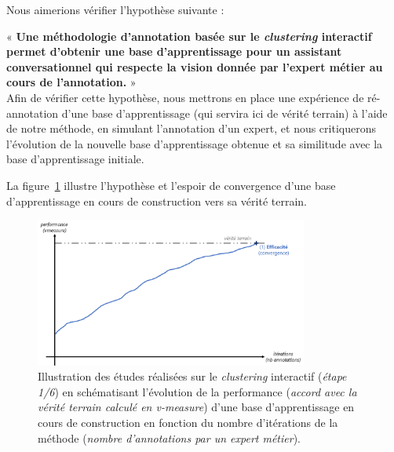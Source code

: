 		Nous aimerions vérifier l'hypothèse suivante :

		\begin{tcolorbox}[
			title=\textbf{Hypothèse d'efficacité},
			colback=gray!20,
			colframe=gray!50!black!75,
			width=\linewidth
		]
			« \textbf{
				Une méthodologie d'annotation basée sur le \textit{clustering} interactif permet d'obtenir une base d'apprentissage pour un assistant conversationnel qui respecte la vision donnée par l'expert métier au cours de l'annotation.
			} » \\
			
			Afin de vérifier cette hypothèse, nous mettrons en place une expérience de ré-annotation d'une base d'apprentissage (qui servira ici de vérité terrain) à l'aide de notre méthode, en simulant l'annotation d'un expert, et nous critiquerons l'évolution de la nouvelle base d'apprentissage obtenue et sa similitude avec la base d'apprentissage initiale.
			
			La figure~\ref{figure:4.1-HYPOTHESE-EFFICACITE} illustre l'hypothèse et l'espoir de convergence d'une base d'apprentissage en cours de construction vers sa vérité terrain.
			\begin{figure}[H]
				\centering
				\includegraphics[width=0.8\textwidth]{figures/hypotheses-01-efficacite}
				\caption{Illustration des études réalisées sur le \textit{clustering} interactif (\textit{étape 1/6}) en schématisant l'évolution de la performance (\textit{accord avec la vérité terrain calculé en v-measure}) d'une base d'apprentissage en cours de construction en fonction du nombre d'itérations de la méthode (\textit{nombre d'annotations par un expert métier}).}
				\label{figure:4.1-HYPOTHESE-EFFICACITE}
			\end{figure}

		\end{tcolorbox}
		
